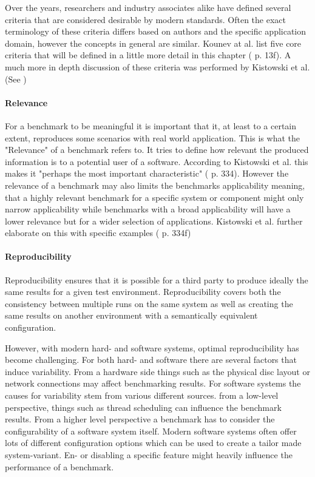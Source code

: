 \documentclass[	runningheads,
				a4paper]{llncs}
\begin{document}
Over the years, researchers and industry associates alike have defined several criteria that are considered desirable by modern standards. Often the exact terminology of these criteria differs based on authors and the specific application domain, however the concepts in general are similar. Kounev at al. list five core criteria that will be defined in a little more detail in this chapter (\cite{Kounev} p. 13f). A much more in depth discussion of these criteria was performed by Kistowski et al. (See \cite{kistowski2015})

\paragraph{Relevance} For a benchmark to be meaningful it is important that it, at least to a certain extent, reproduces some scenarios with real world application. This is what the "Relevance" of a benchmark refers to. It tries to define how relevant the produced information is to a potential user of a software. According to Kistowski et al. this makes it "perhaps the most important characteristic" (\cite{kistowski2015} p. 334). However the relevance of a benchmark may also limits the benchmarks applicability meaning, that a highly relevant benchmark for a specific system or component might only narrow applicability while benchmarks with a broad applicability will have a lower relevance but for a wider selection of applications. Kistowski et al. further elaborate on this with specific examples (\cite{kitowski2015} p. 334f)

\paragraph{Reproducibility} Reproducibility ensures that it is possible for a third party to produce ideally the same results for a given test environment. Reproducibility covers both the consistency between multiple runs on the same system as well as creating the same results on another environment with a semantically equivalent configuration. 

However, with modern hard- and software systems, optimal reproducibility has become challenging. For both hard- and software there are several factors that induce variability. From a hardware side things such as the physical disc layout or network connections may affect benchmarking results. For software systems the causes for variability stem from various different sources. from a low-level perspective, things such as thread scheduling can influence the benchmark results. From a higher level perspective a benchmark has to consider the configurability of a software system itself. Modern software systems often offer lots of different configuration options which can be used to create a tailor made system-variant. En- or disabling a specific feature might heavily influence the performance of a benchmark.
\end{document}
